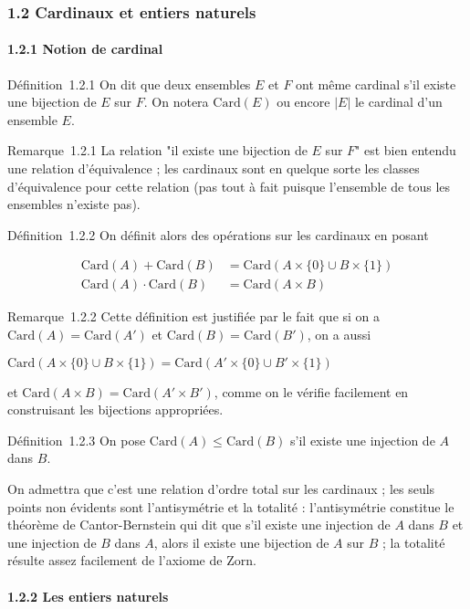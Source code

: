 \subsubsection{1.2 Cardinaux et entiers naturels}

\paragraph{1.2.1 Notion de cardinal}

Définition~1.2.1 On dit que deux ensembles $E$ et $F$ ont même cardinal s'il
existe une bijection de $E$ sur $F$. On notera
$\text{Card}(E)$ ou encore $|E|$ le
cardinal d'un ensemble $E$.

Remarque~1.2.1 La relation "il existe une bijection de $E$ sur $F$" est bien
entendu une relation d'équivalence ; les cardinaux sont en quelque sorte
les classes d'équivalence pour cette relation (pas tout à fait puisque
l'ensemble de tous les ensembles n'existe pas).

Définition~1.2.2 On définit alors des opérations sur les cardinaux en
posant

\begin{align*} 
\text{Card}(A) + \text{Card}(B) &= \text{Card}(A \times \{0\} \cup B \times \{1\}) \\
\text{Card}(A) \cdot \text{Card}(B) &= \text{Card}(A \times B)
\end{align*}

Remarque~1.2.2 Cette définition est justifiée par le fait que si on a
$\text{Card}(A) = \text{Card}(A')$ et
$\text{Card}(B) = \text{Card}(B')$, on a
aussi

$\text{Card}(A \times \{0\} \cup B \times \{1\}) = \text{Card}(A' \times \{0\} \cup B' \times \{1\})$

et $\text{Card}(A \times B) = \text{Card}(A' \times B')$, comme on le vérifie facilement en construisant les
bijections appropriées.

Définition~1.2.3 On pose $\text{Card}(A) \leq \text{Card}(B)$ s'il existe une injection de $A$ dans $B$.

On admettra que c'est une relation d'ordre total sur les cardinaux ; les
seuls points non évidents sont l'antisymétrie et la totalité :
l'antisymétrie constitue le théorème de Cantor-Bernstein qui dit que
s'il existe une injection de $A$ dans $B$ et une injection de $B$ dans $A$,
alors il existe une bijection de $A$ sur $B$ ; la totalité résulte assez
facilement de l'axiome de Zorn.

\paragraph{1.2.2 Les entiers naturels}

